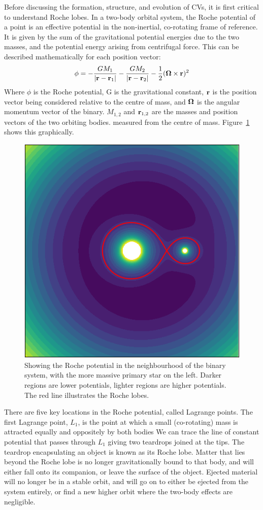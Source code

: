 Before discussing the formation, structure, and evolution of CVs, it is first critical to understand Roche lobes.
In a two-body orbital system, the Roche potential of a point is an effective potential in the non-inertial, co-rotating frame of reference. It is given by the sum of the gravitational potential energies due to the two masses, and the potential energy arising from centrifugal force. This can be described mathematically for each position vector:
\begin{equation}
    {\bf \phi} = -\frac{G M_1}{|{\bf r - r}_1|} - \frac{G M_2}{|{\bf r - r}_2|} - \frac{1}{2}({\bf \Omega} \times {\bf r})^2
\end{equation}
Where $\phi$ is the Roche potential, G is the gravitational constant, $\bf r$ is the position vector being considered relative to the centre of mass, and $\bf \Omega$ is the angular momentum vector of the binary. $M_{1,2}$ and ${\bf r}_{1,2}$ are the masses and position vectors of the two orbiting bodies. measured from the centre of mass. Figure~\ref{fig:roche} shows this graphically. 
\begin{figure}
    \centering
    \includegraphics[width=.6\columnwidth]{figures/introduction/roche.png}
    \caption{Showing the Roche potential in the neighbourhood of the binary system, with the more massive primary star on the left. Darker regions are lower potentials, lighter regions are higher potentials. The red line illustrates the Roche lobes.}
    \label{fig:roche}
\end{figure}

There are five key locations in the Roche potential, called Lagrange points. The first Lagrange point, $L_1$, is the point at which a small (co-rotating) mass is attracted equally and oppositely by both bodies
We can trace the line of constant potential that passes through $L_1$ giving two teardrops joined at the tips. The teardrop encapsulating an object is known as its Roche lobe. 
Matter that lies beyond the Roche lobe is no longer gravitationally bound to that body, and will either fall onto its companion, or leave the surface of the object. 
Ejected material will no longer be in a stable orbit, and will go on to either be ejected from the system entirely, or find a new higher orbit where the two-body effects are negligible.

